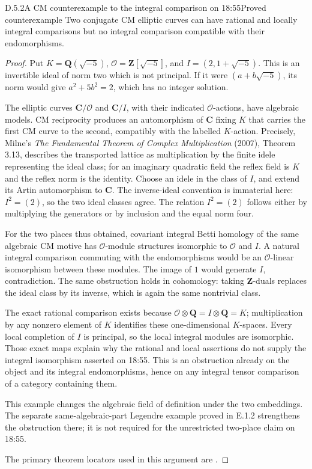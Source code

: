 \begin{result}{D.5.2}{A CM counterexample to the integral comparison on 18:55}{Proved counterexample}
Two conjugate CM elliptic curves can have rational and locally integral comparisons but no integral comparison compatible with their endomorphisms.
\end{result}
\begin{proof}
Put \(K=\mathbf Q(\sqrt{-5})\),
\(\mathcal O=\mathbf Z[\sqrt{-5}]\), and
\(I=(2,1+\sqrt{-5})\). This is an invertible ideal of norm two
which is not principal. If it were \((a+b\sqrt{-5})\), its norm
would give \(a^2+5b^2=2\), which has no integer solution.

The elliptic curves \(\mathbf C/\mathcal O\) and
\(\mathbf C/I\), with their indicated \(\mathcal O\)-actions,
have algebraic models. CM reciprocity produces an automorphism of
\(\mathbf C\) fixing \(K\) that carries the first CM curve to
the second, compatibly with the labelled \(K\)-action. Precisely,
Milne's \emph{The Fundamental Theorem of Complex Multiplication} (2007),
Theorem 3.13, describes the transported lattice as multiplication
by the finite idele representing the ideal class; for an imaginary
quadratic field the reflex field is \(K\) and the reflex norm is
the identity. Choose an idele in the class of \(I\), and extend
its Artin automorphism to \(\mathbf C\). The inverse-ideal
convention is immaterial here: \(I^2=(2)\), so the two ideal
classes agree. The relation \(I^2=(2)\) follows either by multiplying
the generators or by inclusion and the equal norm four.

For the two places thus obtained, covariant integral Betti
homology of the same algebraic CM motive has \(\mathcal O\)-module
structures isomorphic to \(\mathcal O\) and \(I\). A natural
integral comparison commuting with the endomorphisms would be an
\(\mathcal O\)-linear isomorphism between these modules. The image
of \(1\) would generate \(I\), contradiction. The same obstruction
holds in cohomology: taking \(\mathbf Z\)-duals replaces the ideal
class by its inverse, which is again the same nontrivial class.

The exact rational comparison exists because
\(\mathcal O\otimes\mathbf Q=I\otimes\mathbf Q=K\); multiplication
by any nonzero element of \(K\) identifies these one-dimensional
\(K\)-spaces. Every local completion of \(I\) is principal, so
the local integral modules are isomorphic. Those exact maps explain
why the rational and local assertions do not supply the integral
isomorphism asserted on 18:55. This is an obstruction already on
the object and its integral endomorphisms, hence on any integral
tensor comparison of a category containing them.

This example changes the algebraic field of definition under the
two embeddings. The separate same-algebraic-part Legendre example
proved in E.1.2 strengthens the obstruction there; it
is not required for the unrestricted two-place claim on 18:55.

The primary theorem locators used in this argument are \cite[Theorem 3.13, p.24]{GenMilneCM2007}.
\end{proof}

